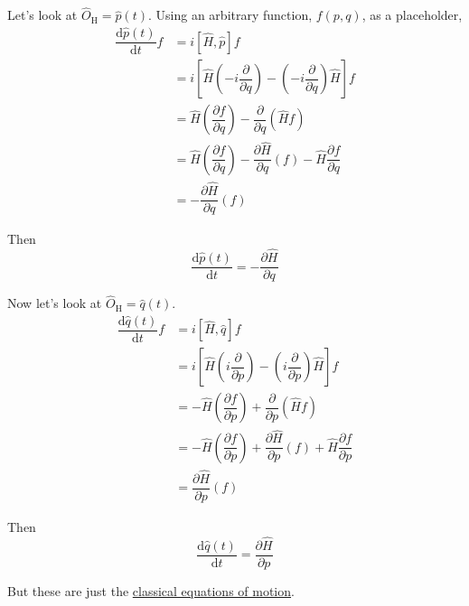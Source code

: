 \documentclass{article}
\begin{document}
\noindent Let's look at $ \hat{O}_\mathrm{H} = \hat{p} (t)$. Using an arbitrary function, $ f (p, q) $, as a placeholder,
\begin{align*}
    \dfrac{ \mathrm{d} \hat{p} (t) }{ \mathrm{d} t } f &= i [ \hat{H}, \hat{p} ] f \\
    &= i \left[ \hat{H} \left( -i \dfrac{\partial}{ \partial q } \right) - \left( -i \dfrac{\partial}{ \partial q } \right) \hat{H} \right] f \\
    &= \hat{H} \left( \dfrac{ \partial f }{ \partial q } \right) - \dfrac{\partial}{ \partial q } \left( \hat{H} f \right) \\
    &= \hat{H} \left( \dfrac{ \partial f }{ \partial q } \right) - \dfrac{ \partial \hat{H} }{ \partial q } \left( f \right) - \hat{H} \dfrac{ \partial f }{ \partial q } \\
    &= - \dfrac{ \partial \hat{H} }{ \partial q } \left( f \right)
\end{align*}


\noindent Then
\begin{equation*}
    \dfrac{ \mathrm{d} \hat{p} (t) }{ \mathrm{d} t } = - \dfrac{ \partial \hat{H} }{ \partial q }
\end{equation*}

\noindent Now let's look at $ \hat{O}_\mathrm{H} = \hat{q} (t)$.
\begin{align*}
    \dfrac{ \mathrm{d} \hat{q} (t) }{ \mathrm{d} t } f &= i [ \hat{H}, \hat{q} ] f \\
    &= i \left[ \hat{H} \left( i \dfrac{\partial}{ \partial p } \right) - \left( i \dfrac{\partial}{ \partial p } \right) \hat{H} \right] f \\
    &= - \hat{H} \left( \dfrac{ \partial f }{ \partial p } \right) + \dfrac{\partial}{ \partial p } \left( \hat{H} f \right) \\
    &= - \hat{H} \left( \dfrac{ \partial f }{ \partial p } \right) + \dfrac{ \partial \hat{H} }{ \partial p } \left( f \right) + \hat{H} \dfrac{ \partial f }{ \partial p } \\
    &= \dfrac{ \partial \hat{H} }{ \partial p } \left( f \right)
\end{align*}

\noindent Then
\begin{equation*}
    \dfrac{ \mathrm{d} \hat{q} (t) }{ \mathrm{d} t } = \dfrac{ \partial \hat{H} }{ \partial p }
\end{equation*}

\noindent But these are just the \underline{classical equations of motion}.
\end{document}
